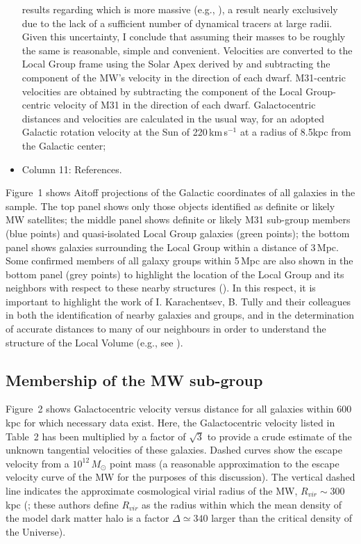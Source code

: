 \documentclass[manuscript]{aastex}
\begin{document}
\begin{itemize}
  results regarding which is more massive (e.g.,
  \citealt{little1987,kochanek1996,wilkinson1999,evans2000a,evans2000b,klypin2002,ibata2004,geehan2005,watkins2010,mcmillan2011}),
  a result nearly exclusively due to the lack of a sufficient number
  of dynamical tracers at large radii. Given this uncertainty, I
  conclude that assuming their masses to be roughly the same is
  reasonable, simple and convenient. Velocities are converted to the
  Local Group frame using the Solar Apex derived by
  \cite{karachentsev1996} and subtracting the component of the MW's
  velocity in the direction of each dwarf. M31-centric velocities are
  obtained by subtracting the component of the Local Group-centric
  velocity of M31 in the direction of each dwarf. Galactocentric
  distances and velocities are calculated in the usual way, for an
  adopted Galactic rotation velocity at the Sun of 220\,km\,s$^{-1}$
  at a radius of 8.5kpc from the Galactic center;
\item Column 11: References.
\end{itemize}

Figure~1 shows Aitoff projections of the Galactic coordinates of all
galaxies in the sample. The top panel shows only those objects
identified as definite or likely MW satellites; the middle panel shows
definite or likely M31 sub-group members (blue points) and quasi-isolated
Local Group galaxies (green points); the bottom panel shows galaxies
surrounding the Local Group within a distance of 3\,Mpc. Some
confirmed members of all galaxy groups within 5\,Mpc are also shown in
the bottom panel (grey points) to highlight the location of the Local
Group and its neighbors with respect to these nearby structures
(\citealt{karachentsev2005}). In this respect, it is important to
highlight the work of I. Karachentsev, B. Tully and their colleagues
in both the identification of nearby galaxies and groups, and in the
determination of accurate distances to many of our neighbours in order
to understand the structure of the Local Volume (e.g., see
\citealt{karachentsev1994,karachentsev2003a,karachentsev2004, tully1987,tully2006,tully2009}).

\subsection{Membership of the MW sub-group}

Figure~2 shows Galactocentric velocity versus distance for all
galaxies within 600\,kpc for which necessary data exist. Here, the
Galactocentric velocity listed in Table~2 has been multiplied by a
factor of $\sqrt3$ to provide a crude estimate of the unknown
tangential velocities of these galaxies. Dashed curves show the escape
velocity from a $10^{12}\,M_\odot$ point mass (a reasonable
approximation to the escape velocity curve of the MW for the purposes
of this discussion). The vertical dashed line indicates the
approximate cosmological virial radius of the MW, $R_{vir} \sim
300$\,kpc (\citealt{klypin2002}; these authors define $R_{vir}$ as the radius within
which the mean density of the model dark matter halo is a factor $\Delta
\simeq 340$ larger than the critical density of the Universe).
\end{document}
